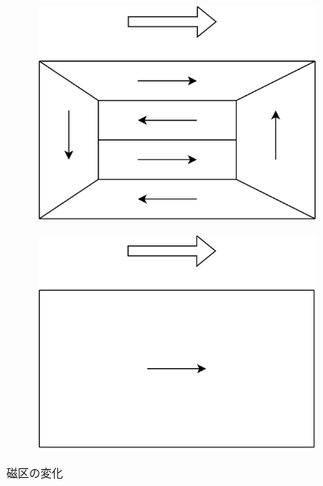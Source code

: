 \begin{figure}
    \centering
    \begin{subfigure}{0.48\linewidth}
        \centering
        \includegraphics[width=0.8\linewidth]{src/figures/magnetic-domain/magnetic-domain.png}
        \label{subfig:magnetic-domain-before}
    \end{subfigure}
    \begin{subfigure}{0.48\linewidth}
        \centering
        \includegraphics[width=0.8\linewidth]{src/figures/magnetic-domain/magnetic-domain-2.png}
        \label{subfig:magnetic-domain-after}
    \end{subfigure}
    \caption{磁区の変化}\label{fig:magnetic-domain}
\end{figure}
